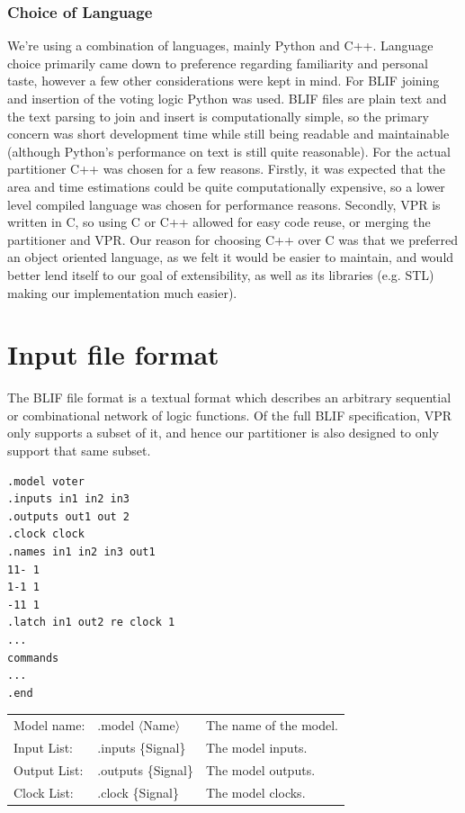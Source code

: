 \documentclass[12pt,drafta4paper,oneside]{memoir} %
\begin{document}
\subsubsection{Choice of Language}
We're using a combination of languages, mainly Python and C++. Language choice primarily came down to preference regarding familiarity and personal taste, however a few other considerations were kept in mind.
For \ac{BLIF} joining and insertion of the voting logic Python was used. \ac{BLIF} files are plain text and the text parsing to join and insert is computationally simple, so the primary concern was short development time while still being readable and maintainable (although Python's performance on text is still quite reasonable)\cite{LanguageBenchmark}.
For the actual partitioner C++ was chosen for a few reasons. Firstly, it was expected that the area and time estimations could be quite computationally expensive, so a lower level compiled language was chosen for performance reasons\cite{LanguageBenchmark}. Secondly, \ac{VPR} is written in C, so using C or C++ allowed for easy code reuse, or merging the partitioner and \ac{VPR}. Our reason for choosing C++ over C was that we preferred an object oriented language, as we felt it would be easier to maintain, and would better lend itself to our goal of extensibility, as well as its libraries (e.g. \ac{STL}) making our implementation much easier).

\section{Input file format}\label{BLIFSection}
The \ac{BLIF} file format is a textual format which describes an arbitrary sequential or combinational network of logic functions\cite{BLIF}.
Of the full \ac{BLIF} specification, \ac{VPR} only supports a subset of it, and hence our partitioner is also designed to only support that same subset.
\begin{lstlisting}[caption=BLIF file layout, label=SampleBlif]
.model voter
.inputs in1 in2 in3
.outputs out1 out 2
.clock clock
.names in1 in2 in3 out1
11- 1
1-1 1
-11 1
.latch in1 out2 re clock 1
...
commands
...
.end
\end{lstlisting}
\begin{tabular}{lll}
    Model name: & .model $\langle$Name$\rangle$ & The name of the model.\\
    Input List: & .inputs \{Signal\} & The model inputs.\\
    Output List:& .outputs \{Signal\} & The model outputs.\\
    Clock List: & .clock \{Signal\} & The model clocks.\\
\end{tabular}
\end{document}

